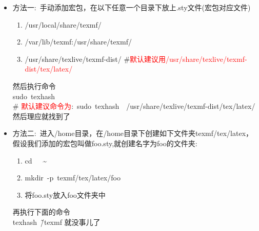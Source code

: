 \documentclass[10pt, oneside, a4paper]{article}      %
\begin{document}
\begin{itemize}
	\item 方法一:~手动添加宏包，在以下任意一个目录下放上\textrm{.sty}文件(宏包对应文件)
		\begin{enumerate}
			\item \textrm{/usr/local/share/texmf/}
			\item \textrm{/var/lib/texmf:/usr/share/texmf/}
			\item \textrm{/usr/share/texlive/texmf-dist/} \qquad\#\textcolor{red}{默认建议用\textrm{/usr/share/texlive/texmf-dist/tex/latex/}}
		\end{enumerate}
然后执行命令\\
\textrm{sudo~texhash}\\
\# \textcolor{red}{默认建议命令为}:~\textrm{sudo~texhash~~/usr/share/texlive/texmf-dist/tex/latex/}\\
然后理应就找到了
\item 方法二:~进入\textrm{/home}目录，在\textrm{/home}目录下创建如下文件夹\textrm{texmf/tex/latex}，假设我们添加的宏包叫做\textrm{foo.sty},就创建名字为\textrm{foo}的文件夹:
	\begin{enumerate}
		\item \textrm{cd~~~\~}
		\item \textrm{mkdir~-p~texmf/tex/latex/foo}
		\item 将\textrm{foo.sty}放入\textrm{foo}文件夹中
	\end{enumerate}
再执行下面的命令\\
\textrm{texhash~\~/texmf}
就没事儿了
\end{itemize}


\end{document}
